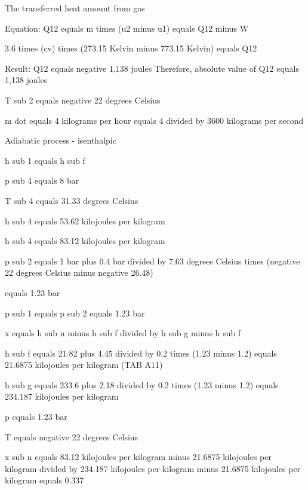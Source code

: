 The transferred heat amount from gas  

Equation: Q12 equals m times (u2 minus u1) equals Q12 minus W  

3.6 times (cv) times (273.15 Kelvin minus 773.15 Kelvin) equals Q12  

Result: Q12 equals negative 1,138 joules  
Therefore, absolute value of Q12 equals 1,138 joules

T sub 2 equals negative 22 degrees Celsius

m dot equals 4 kilograms per hour equals 4 divided by 3600 kilograms per second

Adiabatic process - isenthalpic

h sub 1 equals h sub f

p sub 4 equals 8 bar

T sub 4 equals 31.33 degrees Celsius

h sub 4 equals 53.62 kilojoules per kilogram

h sub 4 equals 83.12 kilojoules per kilogram

p sub 2 equals 1 bar plus 0.4 bar divided by 7.63 degrees Celsius times (negative 22 degrees Celsius minus negative 26.48)

equals 1.23 bar

p sub 1 equals p sub 2 equals 1.23 bar

x equals h sub n minus h sub f divided by h sub g minus h sub f

h sub f equals 21.82 plus 4.45 divided by 0.2 times (1.23 minus 1.2) equals 21.6875 kilojoules per kilogram (TAB A11)

h sub g equals 233.6 plus 2.18 divided by 0.2 times (1.23 minus 1.2) equals 234.187 kilojoules per kilogram

p equals 1.23 bar

T equals negative 22 degrees Celsius

x sub n equals 83.12 kilojoules per kilogram minus 21.6875 kilojoules per kilogram divided by 234.187 kilojoules per kilogram minus 21.6875 kilojoules per kilogram equals 0.337